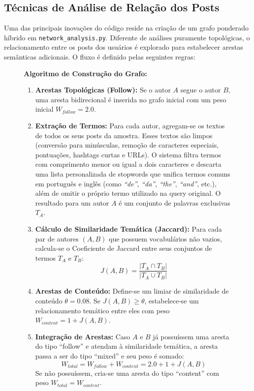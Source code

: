 \documentclass[12pt,a4paper]{article}
\begin{document}
\subsection{Técnicas de Análise de Relação dos Posts}
Uma das principais inovações do código reside na criação de um grafo ponderado híbrido em \texttt{network\_analysis.py}. Diferente de análises puramente topológicas, o relacionamento entre os posts dos usuários é explorado para estabelecer arestas semânticas adicionais. O fluxo é definido pelas seguintes regras:

\begin{figure}[H]
    \centering
    \begin{minipage}{0.9\textwidth}
    \textbf{Algoritmo de Construção do Grafo:}
    \begin{enumerate}
        \item \textbf{Arestas Topológicas (Follow):} Se o autor $A$ segue o autor $B$, uma aresta bidirecional é inserida no grafo inicial com um peso inicial $W_{follow} = 2.0$.
        \item \textbf{Extração de Termos:} Para cada autor, agregam-se os textos de todos os seus posts da amostra. Esses textos são limpos (conversão para minúsculas, remoção de caracteres especiais, pontuações, hashtags curtas e URLs). O sistema filtra termos com comprimento menor ou igual a dois caracteres e descarta uma lista personalizada de stopwords que unifica termos comuns em português e inglês (como \textit{``de''}, \textit{``da''}, \textit{``the''}, \textit{``and''}, etc.), além de omitir o próprio termo utilizado na query original. O resultado para um autor $A$ é um conjunto de palavras exclusivas $T_A$.
        \item \textbf{Cálculo de Similaridade Temática (Jaccard):} Para cada par de autores $(A, B)$ que possuem vocabulários não vazios, calcula-se o Coeficiente de Jaccard entre seus conjuntos de termos $T_A$ e $T_B$:
        \begin{equation}
            J(A, B) = \frac{|T_A \cap T_B|}{|T_A \cup T_B|}
        \end{equation}
        \item \textbf{Arestas de Conteúdo:} Define-se um limiar de similaridade de conteúdo $\theta = 0.08$. Se $J(A, B) \geq \theta$, estabelece-se um relacionamento temático entre eles com peso $W_{content} = 1 + J(A, B)$.
        \item \textbf{Integração de Arestas:} Caso $A$ e $B$ já possuíssem uma aresta do tipo ``follow'' e atendam à similaridade temática, a aresta passa a ser do tipo ``mixed'' e seu peso é somado:
        \begin{equation}
            W_{total} = W_{follow} + W_{content} = 2.0 + 1 + J(A, B)
        \end{equation}
        Se não possuíssem, cria-se uma aresta do tipo ``content'' com peso $W_{total} = W_{content}$.
    \end{enumerate}
    \end{minipage}
\end{figure}
\end{document}
